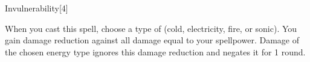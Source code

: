 \begin{spellsection}{Invulnerability}[4]
    \begin{spellheader}
    \end{spellheader}
    \begin{spellcontent}
        \begin{spelltargetinginfo}
        \end{spelltargetinginfo}
        \begin{spelleffects}
            \spellspecial When you cast this spell, choose a type of  (cold, electricity, fire, or sonic).
            \spelleffect You gain damage reduction against all damage equal to your spellpower.
            Damage of the chosen energy type ignores this damage reduction and negates it for 1 round.
            \spelldur \durlong
        \end{spelleffects}
    \end{spellcontent}
    \begin{spellfooter}
        \miscastexplode
    \end{spellfooter}
    \begin{spellaugments}
    \end{spellaugments}
\end{spellsection}

